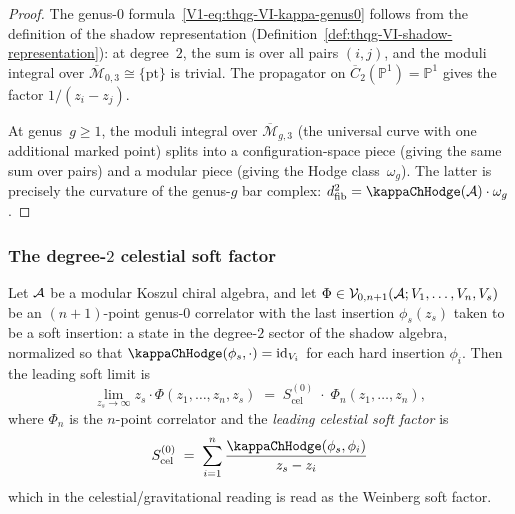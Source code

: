 \begin{proof}
The genus-$0$ formula~\eqref{V1-eq:thqg-VI-kappa-genus0} follows
from the definition of the shadow representation
(Definition~\ref{def:thqg-VI-shadow-representation}): at degree~$2$,
the sum is over all pairs $(i,j)$, and the moduli integral over
$\overline{\mathcal{M}}_{0,3} \cong \{\mathrm{pt}\}$ is trivial.
The propagator on $\overline{C}_2(\mathbb{P}^1) = \mathbb{P}^1$
gives the factor $1/(z_i - z_j)$.

At genus~$g \geq 1$, the moduli integral over
$\overline{\mathcal{M}}_{g,3}$ (the universal curve with one
additional marked point) splits into a configuration-space piece
(giving the same sum over pairs) and a modular piece
(giving the Hodge class~$\omega_g$). The latter is precisely
the curvature of the genus-$g$ bar complex:
$\dfib^2 = \kappaChHodge(\cA) \cdot \omega_g$.
\end{proof}

\subsubsection{The degree-$2$ celestial soft factor}

\begin{theorem}
\label{thm:thqg-VI-leading-soft}
Let $\mathcal{A}$ be a modular Koszul chiral algebra, and let
$\Phi \in \mathcal{V}_{0,n+1}(\mathcal{A}; V_1, \dotsc, V_n, V_s)$ be an
$(n+1)$-point genus-$0$ correlator with the last insertion
$\phi_s(z_s)$ taken to be a soft insertion: a state in the
degree-$2$ sector of the shadow algebra, normalized so that
$\kappaChHodge(\phi_s, \cdot) = \id_{V_i}$ for each hard insertion
$\phi_i$. Then the leading soft limit is
\begin{equation}%
\lim_{z_s \to \infty}
z_s \cdot \Phi(z_1, \dotsc, z_n, z_s)
\;=\;
S^{(0)}_{\mathrm{cel}}
\;\cdot\;
\Phi_n(z_1, \dotsc, z_n),
\end{equation}
where $\Phi_n$ is the $n$-point correlator and the
\emph{leading celestial soft factor} is
\begin{equation}%
S^{(0)}_{\mathrm{cel}}
\;=\;
\sum_{i=1}^{n}
\frac{\kappaChHodge(\phi_s, \phi_i)}{z_s - z_i}
\end{equation}
which in the celestial/gravitational reading is read as the
Weinberg soft factor.
\end{theorem}

